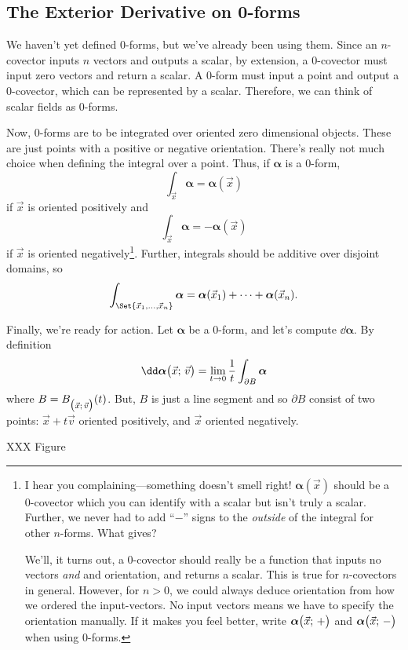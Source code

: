 \subsection{The Exterior Derivative on 0-forms}

We haven't yet defined 0-forms, but we've already been using them.  Since
an $n$-covector inputs $n$ vectors and outputs a scalar, by extension,
a $0$-covector must input zero vectors and return a scalar.  A 0-form
must input a point and output a 0-covector, which can be represented by
a scalar.  Therefore, we can think of scalar fields as 0-forms.

Now, 0-forms are to be integrated over oriented zero dimensional objects.
These are just points with a positive or negative orientation.  There's really not
much choice when defining the integral over a point.  Thus, if $\bm\alpha$
is a 0-form, 
\[
	\int_{\vec x}\bm\alpha = \bm\alpha(\vec x)
\]
if $\vec x$ is oriented positively and 
\[
	\int_{\vec x}\bm\alpha = -\bm\alpha(\vec x)
\]
if $\vec x$ is oriented negatively\footnote{
I hear you complaining---something doesn't smell right!  $\bm\alpha(\vec x)$
should be a 0-covector which you can identify with a scalar but isn't
truly a scalar.  Further, we never had to add ``$-$'' signs to the 
\emph{outside} of the integral for other $n$-forms.  What gives?

We'll, it turns out, a $0$-covector should really be a function
that inputs no vectors \emph{and} and orientation, and returns a scalar.  This is 
true for $n$-covectors in general.  However, for
$n>0$, we could always deduce orientation from how we ordered the input-vectors.  No
input vectors means we have to specify the orientation manually.  If it
makes you feel better, write $\bm\alpha\big(\vec x;\, +\big)$ and $\bm\alpha\big(\vec x;\, -\big)$
when using $0$-forms.
}.  Further, integrals should be additive
over disjoint domains, so
\[
	\int_{\Set{\vec x_1,\ldots,\vec x_n}} \bm\alpha = \bm\alpha(\vec x_1)
	+ \cdots+\bm\alpha(\vec x_n).
\]

Finally, we're ready for action.  Let $\bm\alpha$ be a 0-form, and let's compute
$\dd \bm\alpha$.  By definition
\[
	\dd \bm\alpha\formarg{\vec x}{\vec v}
	= \lim_{t\to 0} \frac{1}{t} \int_{\partial B} \bm\alpha
\]
where $B=B_{\big(\vec x;\, \vec v\big)}(t)$.  But, $B$ is just a line segment
and so $\partial B$ consist of two points: $\vec x+t\vec v$ oriented positively,
and $\vec x$ oriented negatively.

XXX Figure

